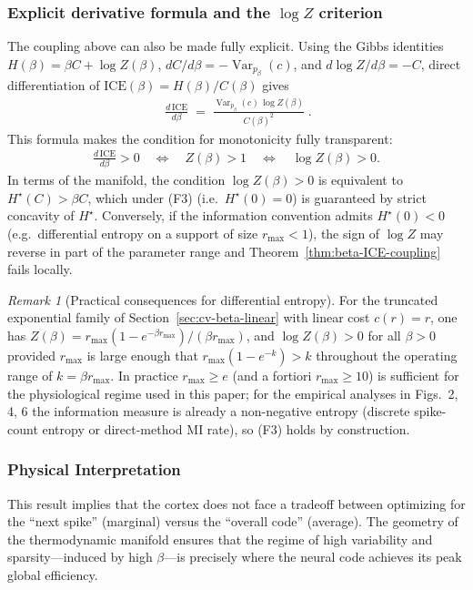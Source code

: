 \documentclass[11pt]{article}
\DeclareMathOperator{\Var}{Var}
\theoremstyle{remark}
\newtheorem{remark}[theorem]{Remark}
\theoremstyle{definition}
\begin{document}
\subsubsection{Explicit derivative formula and the $\log Z$ criterion}
\label{sec:ice-beta-formula}

The coupling above can also be made fully explicit.  Using the Gibbs identities
$H(\beta)=\beta C+\log Z(\beta)$, $dC/d\beta=-\Var_{p_\beta}(c)$, and $d\log Z/d\beta=-C$, direct differentiation of $\mathrm{ICE}(\beta)=H(\beta)/C(\beta)$ gives
\begin{align}
\label{eq:ice-beta-explicit}
\boxed{\;\frac{d\,\mathrm{ICE}}{d\beta}
\;=\;
\frac{\Var_{p_\beta}(c)\,\log Z(\beta)}{C(\beta)^2}\;}.
\end{align}
This formula makes the condition for monotonicity fully transparent:
\begin{align}
\frac{d\,\mathrm{ICE}}{d\beta}>0
\quad\Longleftrightarrow\quad
Z(\beta)>1
\quad\Longleftrightarrow\quad
\log Z(\beta)>0.
\end{align}
In terms of the manifold, the condition $\log Z(\beta)>0$ is equivalent to $H^\star(C)>\beta C$, which under (F3) (i.e.\ $H^\star(0)=0$) is guaranteed by strict concavity of $H^\star$.  Conversely, if the information convention admits $H^\star(0)<0$ (e.g.\ differential entropy on a support of size $r_{\max}<1$), the sign of $\log Z$ may reverse in part of the parameter range and Theorem~\ref{thm:beta-ICE-coupling} fails locally.

\begin{remark}[Practical consequences for differential entropy]
For the truncated exponential family of Section~\ref{sec:cv-beta-linear} with linear cost $c(r)=r$, one has $Z(\beta)=r_{\max}(1-e^{-\beta r_{\max}})/(\beta r_{\max})$, and $\log Z(\beta)>0$ for all $\beta>0$ provided $r_{\max}$ is large enough that $r_{\max}(1-e^{-k})>k$ throughout the operating range of $k=\beta r_{\max}$.  In practice $r_{\max}\ge e$ (and a fortiori $r_{\max}\ge 10$) is sufficient for the physiological regime used in this paper; for the empirical analyses in Figs.~2, 4, 6 the information measure is already a non-negative entropy (discrete spike-count entropy or direct-method MI rate), so (F3) holds by construction.
\end{remark}

\subsubsection{Physical Interpretation}
This result implies that the cortex does not face a tradeoff between optimizing for the ``next spike'' (marginal) versus the ``overall code'' (average). The geometry of the thermodynamic manifold ensures that the regime of high variability and sparsity---induced by high $\beta$---is precisely where the neural code achieves its peak global efficiency.
\end{document}
